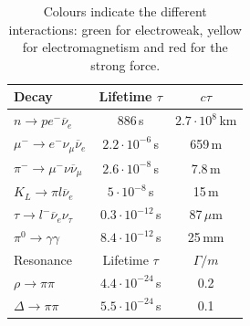 \documentclass[../main.tex]{subfiles}
\begin{document}
\begin{table}[h]
    \centering
    \begin{tabular}{lcc}
    \hline
    \rowcolor{gray!45}Decay & Lifetime $\tau$ & $c\tau$\\
    \hline
    \rowcolor{green!45}$n\to pe^-\overline{\nu}_e$ & 886\,s &$2.7\cdot10^8$\,km \\
    \rowcolor{green!45}$\mu^-\to e^-\nu_\mu\overline{\nu}_e$ & $2.2\cdot10^{-6}$\,s & 659\,m\\
    \rowcolor{green!45}$\pi^-\to \mu^-\nu\overline{\nu}_\mu$ & $2.6\cdot10^{-8}$\,s & 7.8\,m\\
    \rowcolor{green!45}$K_L\to\pi l\overline{\nu}_e$ & $5\cdot10^{-8}$\,s & 15\,m\\
    \rowcolor{green!45}$\tau\to l^-\overline{\nu}_e\nu_\tau$ & $0.3\cdot10^{-12}$\,s & 87\,$\mu$m\\
    \rowcolor{yellow!45}$\pi^0\to\gamma\gamma$ & $8.4\cdot10^{-12}$\,s & 25\,mm\\
    \hline\hline
    \rowcolor{gray!45}Resonance & Lifetime $\tau$ & $\Gamma/m$\\
    \hline
    \rowcolor{red!45}$\rho\to\pi\pi$ & $4.4\cdot10^{-24}$\,s & 0.2\\
    \rowcolor{red!45}$\Delta\to\pi\pi$ & $5.5\cdot10^{-24}$\,s & 0.1\\
    \hline
    \end{tabular}
    \caption{Colours indicate the different interactions: green for electroweak, yellow for electromagnetism and red for the strong force.}
    \label{tab:my_label}
\end{table}\\
\end{document}
